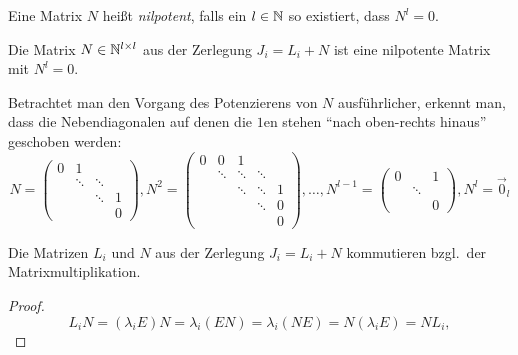 \begin{definition}[Wiederholung]
    Eine Matrix $N$ heißt \emph{nilpotent}, falls ein $l \in \mathbb{N}$ so existiert, dass $N^l = 0$.
\end{definition}

\begin{corollary}
    Die Matrix $N \in \mathbb{N}^{l \times l}$ aus der Zerlegung $J_i = L_i + N$ ist eine nilpotente Matrix mit $N^l = 0$.
\end{corollary}

Betrachtet man den Vorgang des Potenzierens von $N$ ausführlicher, erkennt man,
dass die Nebendiagonalen auf denen die $1$en stehen \enquote{nach oben-rechts hinaus} geschoben werden:
\begin{equation*}
    N = \begin{pmatrix}
             0 & 1      &        & \\
               & \ddots & \ddots & \\
               &        & \ddots & 1\\
               &        &        & 0
         \end{pmatrix},
    N^2 = \begin{pmatrix}
               0 & 0      & 1      &        & \\
                 & \ddots & \ddots & \ddots & \\
                 &        & \ddots & \ddots & 1\\
                 &        &        & \ddots & 0\\
                 &        &        &        & 0
           \end{pmatrix},
    \dots,
    N^{l-1} = \begin{pmatrix}
                   0 &        & 1\\
                     & \ddots & \\
                     &        & 0
              \end{pmatrix},
    N^l = \vec{0}_l
\end{equation*}

\begin{lemma}
    Die Matrizen $L_i$ und $N$ aus der Zerlegung $J_i = L_i + N$ kommutieren bzgl.\ der Matrixmultiplikation.
\end{lemma}

\begin{proof}
    \begin{equation*}
        L_i N = (\lambda_i E) N = \lambda_i (EN) = \lambda_i (NE) = N (\lambda_i E) = N L_i,
    \end{equation*}
\end{proof}

